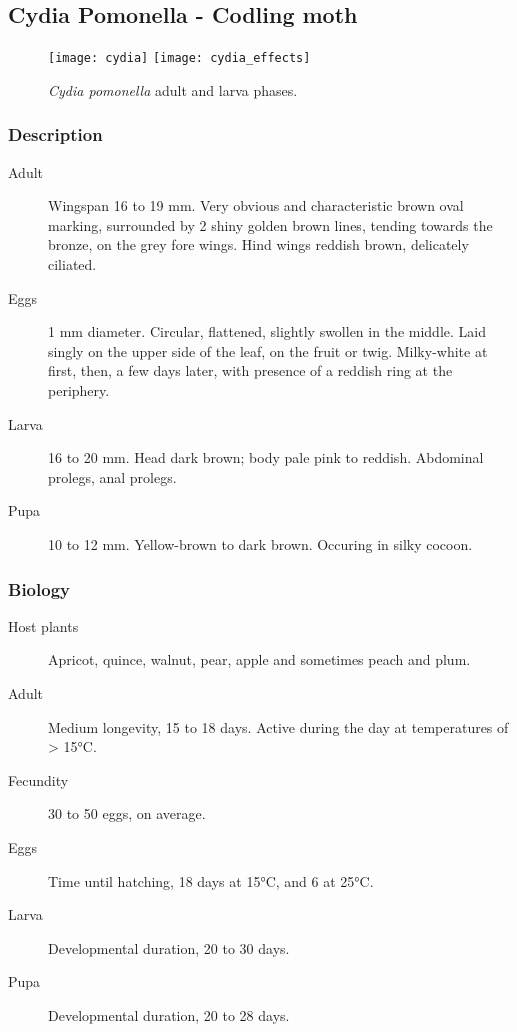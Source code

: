 \subsection{Cydia Pomonella - Codling moth}

\begin{figure}[htbp]
  \centering
    {\texttt{[image: cydia]}}%
  \hfill
    {\texttt{[image: cydia\_effects]}}%
  \caption{\textit{Cydia pomonella} adult and larva phases.}
  \label{fig:cydia_figs}
\end{figure}

\subsubsection{Description}

\begin{description}
	\item [Adult] Wingspan 16 to 19 mm. Very obvious and characteristic brown oval marking, surrounded by 2 shiny golden brown lines, tending towards the bronze, on the grey fore wings. Hind wings reddish brown, delicately ciliated.
	\item [Eggs] 1 mm diameter. Circular, flattened, slightly swollen in the middle. Laid singly on the upper side of the leaf, on the fruit or twig. Milky-white at first, then, a few days later, with presence of a reddish ring at the periphery.
	\item [Larva] 16 to 20 mm. Head dark brown; body pale pink to reddish. Abdominal prolegs, anal prolegs.
	\item [Pupa] 10 to 12 mm. Yellow-brown to dark brown. Occuring in silky cocoon.
\end{description}

\subsubsection{Biology}

\begin{description}
	\item [Host plants] Apricot, quince, walnut, pear, apple and sometimes peach and plum.
	\item [Adult] Medium longevity, 15 to 18 days. Active during the day at temperatures of > 15°C.
	\item [Fecundity] 30 to 50 eggs, on average.
	\item [Eggs] Time until hatching, 18 days at 15°C, and 6 at 25°C.
	\item [Larva] Developmental duration, 20 to 30 days.
	\item [Pupa] Developmental duration, 20 to 28 days.
\end{description}

